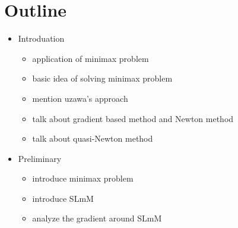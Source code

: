 \documentclass{article}
\begin{document}
\section{Outline}
\begin{itemize}
    \item Introduation
    \begin{itemize}
        \item application of minimax problem
        \item basic idea of solving minimax problem
        \item mention uzawa's approach
        \item talk about gradient based method and Newton method
        \item talk about quasi-Newton method
    \end{itemize}
    \item Preliminary
    \begin{itemize}
        \item introduce minimax problem
        \item introduce SLmM
        \item analyze the gradient around SLmM
    \end{itemize}
\end{itemize}



\end{document}
